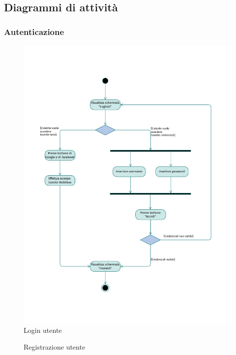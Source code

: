 \documentclass{natourDoc}
\begin{document}
\newpage
\subsection{Diagrammi di attività}

\subsubsection{Autenticazione}
\begin{figure}[!htbp]
	\centering
	\includegraphics[width=\textwidth, page=1]{./diagrams/activity.pdf}
	\caption{Login utente}
\end{figure}
\FloatBarrier

\newpage
\begin{figure}[!htbp]
	\centering
	
	\caption{Registrazione utente}
\end{figure}
\FloatBarrier
\end{document}
